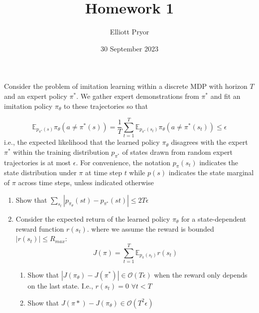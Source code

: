 \documentclass[11pt]{article}
\title{Homework 1}
\author{Elliott Pryor}
\date{30 September 2023}
\begin{document}
\maketitle


Consider the problem of imitation learning within a discrete MDP with horizon $T$ and an expert
policy $\pi^*$. We gather expert demonstrations from $\pi^*$ and fit an imitation policy $\pi_\theta$ to these
trajectories so that

\begin{equation}
    \mathbb{E}_{p_{\pi^*}(s)} \pi_\theta(a \neq \pi^*(s)) = \frac{1}{T} \sum^{T}_{t=1} \mathbb{E}_{p_{\pi^*}(s_t)} \pi_\theta(a \neq \pi^*(s_t)) \leq \epsilon
\end{equation}
i.e., the expected likelihood that the learned policy $\pi_\theta$ disagrees with the expert $\pi^*$ within the
training distribution $p_{\pi^*}$ of states drawn from random expert trajectories is at most $\epsilon$.
For convenience, the notation $p_\pi (s_t)$ indicates the state distribution under $\pi$ at time step $t$ while
$p(s)$ indicates the state marginal of $\pi$ across time steps, unless indicated otherwise

\begin{enumerate}
    \item Show that $\sum_{s_t} \left| p_{\pi_\theta}(st) - p_{\pi^*}(st) \right| \leq 2T\epsilon$
    \item Consider the expected return of the learned policy $\pi_\theta$ for a state-dependent reward function $r(s_t)$.
    where we assume the reward is bounded $|r(s_t)| \leq R_{max}$:
    $$
    J(\pi) = \sum_{t=1}^T \mathbb{E}_{p_\pi(s_t)} r(s_t)
    $$
        \begin{enumerate}
            \item Show that $|J(\pi_\theta) - J(\pi^*)| \in \mathcal{O}(T\epsilon)$ when the reward only depends on the last state.
            I.e., $r(s_t) = 0$ $\forall t<T$
            \item Show that $J(\pi*) - J(\pi_\theta) \in \mathcal{O}(T^2 \epsilon)$
        \end{enumerate}
\end{enumerate}

\soln
\end{document}
